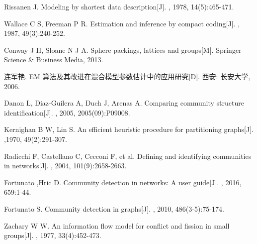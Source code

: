 \documentclass[a4paper,12pt,openany,oneside,utf-8]{ctexbook}
\begin{document}
\begin{spacing}{1.2}
\begin{thebibliography}{1}
{            
            Rissanen J.
            \newblock Modeling by shortest data description[J].
            ,{ 1978}, {14(5):465-471}.
            
            Wallace C S, Freeman P R.
            \newblock Estimation and inference by compact coding[J].
            ,{ 1987}, { 49(3):240-252}.
            
            Conway J H, Sloane N J A.
            \newblock Sphere packings, lattices and groups[M]. Springer
              Science \& Business Media,  2013.
            
            连军艳.
            \newblock EM 算法及其改进在混合模型参数估计中的应用研究[D].
            \newblock 西安: 长安大学,  2006.
            
            Danon L, Diaz-Guilera A, Duch J, Arenas A.
            \newblock Comparing community structure identification[J].
            ,{
              2005}, {2005(09):P09008}.
            
            Kernighan B W, Lin S.
            \newblock An efficient heuristic procedure for partitioning graphs[J].
            ,{1970}, {
              49(2):291-307}.
            
            Radicchi F, Castellano C, Cecconi F, et al. 
            \newblock Defining and identifying communities in networks[J].
            ,{ 2004},
              {101(9):2658-2663}.
            
            Fortunato ,Hric D.
            \newblock Community detection in networks: A user guide[J].
            ,{ 2016}, { 659:1-44}.
            
            Fortunato S.
            \newblock Community detection in graphs[J].
            ,{ 2010}, {486(3-5):75-174}.
            

            Zachary W W.
            \newblock An information flow model for conflict and fission in small groups[J].
            ,{ 1977}, {
              33(4):452-473}.
            
}
\end{thebibliography}
\end{spacing}
\end{document}
